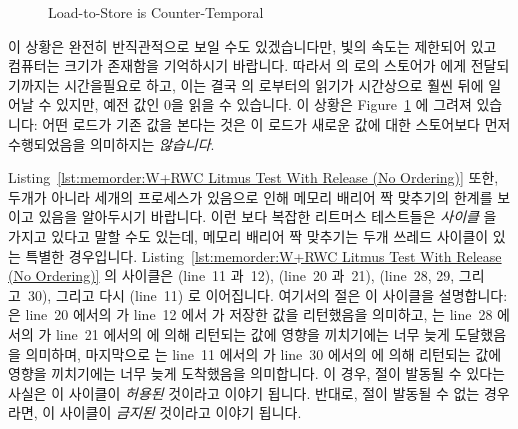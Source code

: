 \begin{figure}[htbp]
\centering
{}
\caption{Load-to-Store is Counter-Temporal}
\label{fig:memorder:Load-to-Store is Counter-Temporal}
\end{figure}

이 상황은 완전히 반직관적으로 보일 수도 있겠습니다만, 빛의 속도는 제한되어 있고
컴퓨터는 크기가 존재함을 기억하시기 바랍니다.
따라서  의  로의 스토어가  에게 전달되기까지는
시간을필요로 하고, 이는 결국  의  로부터의 읽기가 시간상으로
훨씬 뒤에 일어날 수 있지만, 예전 값인 0을 읽을 수 있습니다.
이 상황은
Figure~\ref{fig:memorder:Load-to-Store is Counter-Temporal} 에 그려져 있습니다:
어떤 로드가 기존 값을 본다는 것은 이 로드가 새로운 값에 대한 스토어보다 먼저
수행되었음을 의미하지는 \emph{않습니다}.

Listing~\ref{lst:memorder:W+RWC Litmus Test With Release (No Ordering)}
또한, 두개가 아니라 세개의 프로세스가 있음으로 인해 메모리 배리어 짝 맞추기의
한계를 보이고 있음을 알아두시기 바랍니다.
이런 보다 복잡한 리트머스 테스트들은 \emph{사이클} 을 가지고 있다고 말할 수도
있는데, 메모리 배리어 짝 맞추기는 두개 쓰레드 사이클이 있는 특별한 경우입니다.
Listing~\ref{lst:memorder:W+RWC Litmus Test With Release (No Ordering)}
의 사이클은  (line~11 과~12),  (line~20 과~21), 
(line~28, 29, 그리고~30), 그리고 다시  (line~11) 로 이어집니다.
여기서의  절은 이 사이클을 설명합니다:
 은 line~20 에서의  가 line~12 에서
 가 저장한 값을 리턴했음을 의미하고,  는
line~28 에서의  가 line~21 에서의  에 의해
리턴되는 값에 영향을 끼치기에는 너무 늦게 도달했음을 의미하며, 마지막으로
 는 line~11 에서의  가 line~30 에서의
 에 의해 리턴되는 값에 영향을 끼치기에는 너무 늦게 도착했음을
의미합니다.
이 경우,  절이 발동될 수 있다는 사실은 이 사이클이 \emph{허용된}
것이라고 이야기 됩니다.
반대로,  절이 발동될 수 없는 경우라면, 이 사이클이 \emph{금지된}
것이라고 이야기 됩니다.
\iffalse

